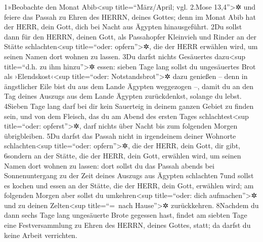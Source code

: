 1»Beobachte den Monat Abib\textless sup title=``März/April; vgl. 2.Mose
13,4''\textgreater✲ und feiere das Passah zu Ehren des HERRN, deines
Gottes; denn im Monat Abib hat der HERR, dein Gott, dich bei Nacht aus
Ägypten hinausgeführt. 2Du sollst dann für den HERRN, deinen Gott, als
Passahopfer Kleinvieh und Rinder an der Stätte schlachten\textless sup
title=``oder: opfern''\textgreater✲, die der HERR erwählen wird, um
seinen Namen dort wohnen zu lassen. 3Du darfst nichts Gesäuertes
dazu\textless sup title=``d.h. zu ihm hinzu''\textgreater✲ essen: sieben
Tage lang sollst du ungesäuertes Brot als ›Elendskost‹\textless sup
title=``oder: Notstandsbrot''\textgreater✲ dazu genießen -- denn in
ängstlicher Eile bist du aus dem Lande Ägypten weggezogen --, damit du
an den Tag deines Auszugs aus dem Lande Ägypten zurückdenkst, solange du
lebst. 4Sieben Tage lang darf bei dir kein Sauerteig in deinem ganzen
Gebiet zu finden sein, und von dem Fleisch, das du am Abend des ersten
Tages schlachtest\textless sup title=``oder: opferst''\textgreater✲,
darf nichts über Nacht bis zum folgenden Morgen übrigbleiben. 5Du darfst
das Passah nicht in irgendeinem deiner Wohnorte schlachten\textless sup
title=``oder: opfern''\textgreater✲, die der HERR, dein Gott, dir gibt,
6sondern an der Stätte, die der HERR, dein Gott, erwählen wird, um
seinen Namen dort wohnen zu lassen: dort sollst du das Passah abends bei
Sonnenuntergang zu der Zeit deines Auszugs aus Ägypten schlachten 7und
sollst es kochen und essen an der Stätte, die der HERR, dein Gott,
erwählen wird; am folgenden Morgen aber sollst du umkehren\textless sup
title=``oder: dich aufmachen''\textgreater✲ und zu deinen
Zelten\textless sup title=``=~nach Hause''\textgreater✲ zurückkehren.
8Nachdem du dann sechs Tage lang ungesäuerte Brote gegessen hast, findet
am siebten Tage eine Festversammlung zu Ehren des HERRN, deines Gottes,
statt; da darfst du keine Arbeit verrichten.

